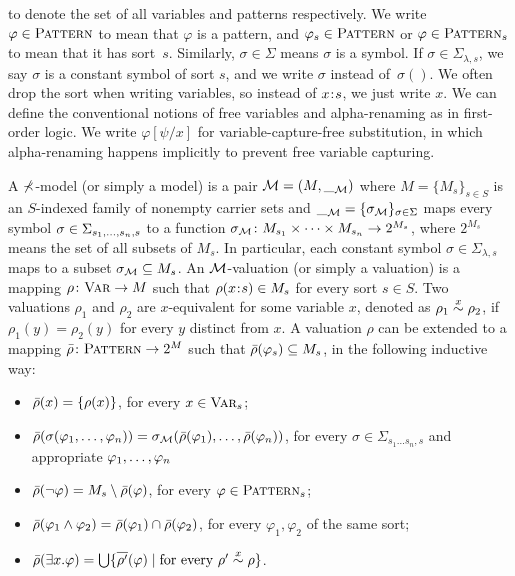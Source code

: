 to denote the set of all variables and patterns respectively.
We write
$\varphi \in \textsc{Pattern}$ to mean that $\varphi$ is a pattern,
and $\varphi_s \in \textsc{Pattern}$ or $\varphi \in \textsc{Pattern}_s$ to mean that
it has sort~$s$.
Similarly, $\sigma \in \Sigma$ means $\sigma$ is a symbol.
If $\sigma \in \Sigma_{\lambda, s}$, we say $\sigma$
is a constant symbol of sort $s$, and
we write $\sigma$ instead of~$\sigma()$.
We often drop the sort when writing variables, 
so instead of $x \mathbin{\!:\!} s$, we just write $x$.
We can define the conventional notions of free variables and
alpha-renaming as in first-order logic.
We write $\varphi [\psi/x]$ for variable-capture-free substitution,
in which alpha-renaming happens implicitly to prevent
free variable capturing.

A $\mathbb{\Sigma}$-model (or simply a model) is a pair
$\mathcal{M} = (M, \__{\mathcal{M}})$ 
where $M = \{M_s\}_{s \in S}$ 
is an $S$-indexed family of nonempty carrier sets
and $\__{\mathcal{M}} = \{ {\sigma_{\mathcal{M}}} \}_{\sigma \in \Sigma}$
maps every symbol $\sigma \in \Sigma_{s_1 ,\dots, s_n , s}$
to a function
${\sigma_{\mathcal{M}}} \colon M_{s_1} \times \dots \times M_{s_n} \to 2^{M_s}$,
where $2^{M_s}$ means the set of all subsets of $M_s$.
In particular, each constant symbol
$\sigma \in \Sigma_{\lambda,s}$ 
maps to a subset ${\sigma_{\mathcal{M}}} \subseteq M_s$.
An $\mathcal{M}$-valuation (or simply a valuation) is a mapping
$\rho \colon \textsc{Var} \to M$
such that $\rho(x \mathbin{\!:\!} s) \in M_s$ for every sort $s \in S$.
Two valuations $\rho_1$ and $\rho_2$ are $x$-equivalent for some variable $x$,
denoted as $\rho_1 \overset{x}{\sim} \rho_2$,
if $\rho_1(y) = \rho_2(y)$ for every $y$ distinct from $x$.
A valuation $\rho$ can be extended to a mapping
$\bar{\rho} \colon \textsc{Pattern} \to 2^{M}$
such that $\bar{\rho}(\varphi_s) \subseteq M_s$,
in the following inductive way:
\begin{itemize}
\item $\bar{\rho}(x) = \{ \rho(x) \}$, for every $x \in \textsc{Var}_s$;
\item $\bar{\rho}(\sigma(\varphi_1 ,\dots, \varphi_n))
       = {\sigma_{\mathcal{M}}}( \bar{\rho}(\varphi_1) ,\dots, \bar{\rho}(\varphi_n) )$,
      for every $\sigma \in \Sigma_{s_1 \dots s_n , s}$
      and appropriate $\varphi_1 ,\dots, \varphi_n$
\item $\bar{\rho}(\neg \varphi) = M_s \setminus \bar{\rho}(\varphi)$,
      for every $\varphi \in \textsc{Pattern}_s$;
\item $\bar{\rho}(\varphi_1 \wedge \varphi_2)
       = \bar{\rho}(\varphi_1) \cap \bar{\rho}(\varphi_2)$,
      for every $\varphi_1,\varphi_2$ of the same sort;
\item $\bar{\rho}(\exists x . \varphi) 
       = \bigcup \{ \overline{\rho'}(\varphi) 
                    \mid \text{for every $\rho' \overset{x}{\sim} \rho$} \}$.
\end{itemize}
